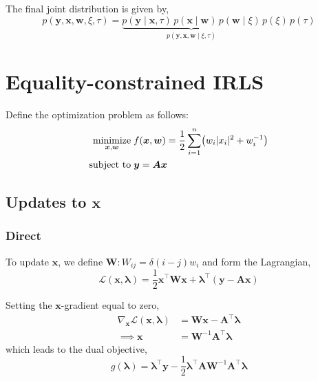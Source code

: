 \documentclass{article}
\numberwithin{equation}{section}
\newcommand{\lh}{\mathopen{}\mathclose\bgroup\left}
\newcommand{\rh}{\aftergroup\egroup\right}
\newcommand{\m}[1]{\boldsymbol{#1}}
\begin{document}
The final joint distribution is given by,
\begin{equation}
p(\m{y}, \m{x}, \m{w}, \xi, \tau) =
 \underbrace{
  p(\m{y} \mid \m{x}, \tau) \,
  p(\m{x} \mid \m{w}) \,
  p(\m{w} \mid \xi)
 }_{p(\m{y}, \m{x}, \m{w} \mid \xi, \tau)} \,
 p(\xi) \, p(\tau)
\end{equation}

\clearpage
\section{Equality-constrained IRLS}
\label{s:irls_ec}
Define the optimization problem as follows:
\begin{equation}
\begin{aligned}
\underset{\m{x}, \m{w}}{\text{minimize}} &\; f(\m{x}, \m{w}) =
 \frac{1}{2} \sum_{i=1}^n \lh( w_i |x_i|^2 + w_i^{-1} \rh)
\\
\text{subject to} &\; \m{y} = \m{A} \m{x}
\end{aligned}
\end{equation}

\subsection{Updates to $\m{x}$}
\subsubsection{Direct}
To update $\m{x}$, we define $\m{W} : W_{ij} = \delta(i-j) w_i$
and form the Lagrangian,
\begin{equation}
\mathcal{L}(\m{x}, \m{\lambda}) =
 \frac{1}{2} \m{x}^\top \m{W} \m{x} +
 \m{\lambda}^\top ( \m{y} - \m{A} \m{x} )
\end{equation}

Setting the $\m{x}$-gradient equal to zero,
\begin{equation}
\begin{aligned}
\nabla_{\m{x}} \mathcal{L}(\m{x}, \m{\lambda}) &=
 \m{W} \m{x} - \m{A}^\top \m{\lambda}
\\ \implies
 \m{x} &= \m{W}^{-1} \m{A}^\top \m{\lambda}
\end{aligned}
\end{equation}
which leads to the dual objective,
\begin{equation}
g(\m{\lambda}) =
 \m{\lambda}^\top \m{y} -
 \frac{1}{2} \m{\lambda}^\top \m{A} \m{W}^{-1} \m{A}^\top \m{\lambda}
\end{equation}
\end{document}

